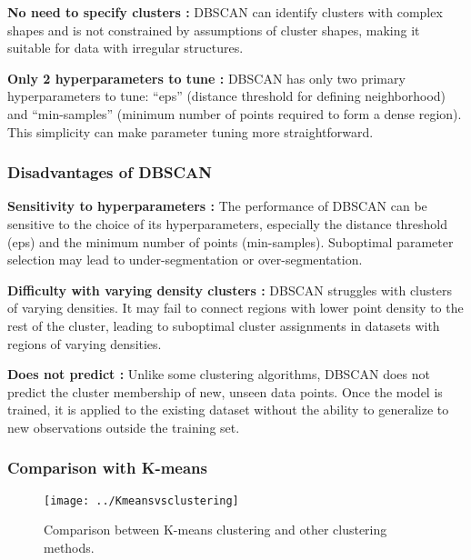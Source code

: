 \par \textbf{No need to specify clusters : }DBSCAN can identify clusters with complex shapes and is not constrained by assumptions of cluster shapes, making it suitable for data with irregular structures.

\par \textbf{Only 2 hyperparameters to tune : } DBSCAN has only two primary hyperparameters to tune: “eps” (distance threshold for defining neighborhood) and “min-samples” (minimum number of points required to form a dense region). This simplicity can make parameter tuning more straightforward.

\subsubsection{Disadvantages of DBSCAN}


\textbf{Sensitivity to hyperparameters : } The performance of DBSCAN can be sensitive to the choice of its hyperparameters, especially the distance threshold (eps) and the minimum number of points (min-samples). Suboptimal parameter selection may lead to under-segmentation or over-segmentation.

\textbf{Difficulty with varying density clusters : }DBSCAN struggles with clusters of varying densities. It may fail to connect regions with lower point density to the rest of the cluster, leading to suboptimal cluster assignments in datasets with regions of varying densities.

\textbf{Does not predict : } Unlike some clustering algorithms, DBSCAN does not predict the cluster membership of new, unseen data points. Once the model is trained, it is applied to the existing dataset without the ability to generalize to new observations outside the training set.


\subsubsection{Comparison with K-means}

\begin{figure}[H] %
	\centering
	\texttt{[image: ../Kmeansvsclustering]}
	\caption{Comparison between K-means clustering and other clustering methods.}
	\label{fig:Kmeansvsclustering}
\end{figure}
